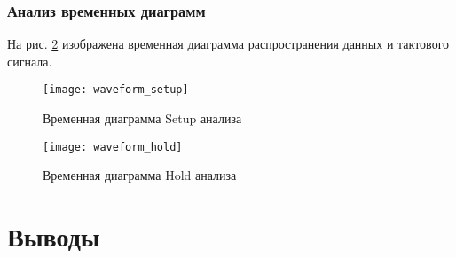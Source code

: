\subsubsection{Анализ временных диаграмм}

На рис. \ref{fig:waveform} изображена временная диаграмма распространения данных и тактового сигнала.

\begin{figure}[H]
\begin{center}
	\texttt{[image: waveform\_setup]}
	\caption{Временная диаграмма Setup анализа}
	\label{fig:waveform}
\end{center}
\end{figure}

\begin{figure}[H]
\begin{center}
	\texttt{[image: waveform\_hold]}
	\caption{Временная диаграмма Hold анализа}
	\label{fig:waveform}
\end{center}
\end{figure}

\section{Выводы}

